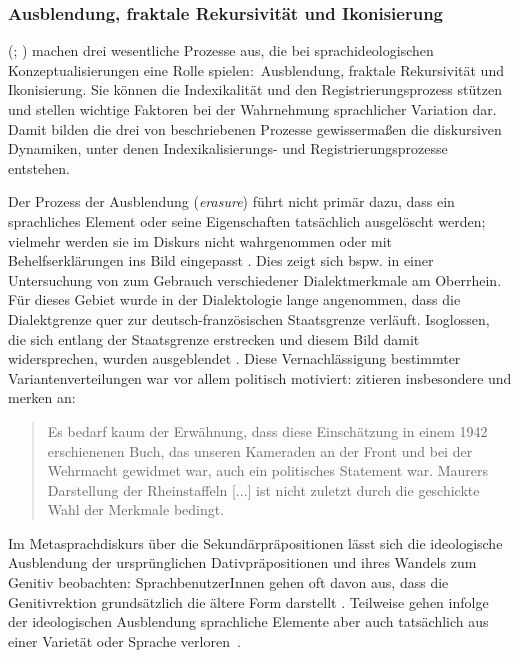 \subsubsection{Ausblendung, fraktale Rekursivität und Ikonisierung}
\label{sec:Prozesse}
\citeauthor{Irvine2000} (\citeyear{Irvine2000}; \citealp[s. auch][]{Gal.1995} \citeyear[und][]{Gal.2019}) machen drei wesentliche Prozesse aus, die bei sprachideologischen Konzeptualisierungen eine Rolle spielen:~Ausblendung, fraktale Rekursivit{\"a}t und Ikonisierung. 
Sie können die Indexikalität und den Registrierungsprozess stützen und stellen wichtige Faktoren bei der Wahrnehmung sprachlicher Variation dar.
Damit bilden die drei von \citet{Irvine2000} beschriebenen Prozesse gewissermaßen die diskursiven Dynamiken, unter denen Indexikalisierungs- und Registrierungsprozesse entstehen. 

Der Prozess der Ausblendung (\textit{erasure}) f{\"u}hrt nicht prim{\"a}r dazu, dass ein sprachliches Element oder seine Eigenschaften tats{\"a}chlich ausgel{\"o}scht werden; vielmehr werden sie im Diskurs nicht wahrgenommen oder mit Behelfserkl{\"a}rungen ins Bild eingepasst \citep[s.][38]{Irvine2000}.   
Dies zeigt sich bspw. in einer Untersuchung von \citet{Auer.2017} zum Gebrauch verschiedener Dialektmerkmale am Oberrhein. 
Für dieses Gebiet wurde in der Dialektologie lange angenommen, dass die Dialektgrenze quer zur deutsch-französischen Staatsgrenze verläuft.
Isoglossen, die sich entlang der Staatsgrenze erstrecken und diesem Bild damit widersprechen, wurden ausgeblendet \citep[s.][29]{Auer.2017}. 
Diese Vernachlässigung bestimmter {Va\-rian\-ten\-ver\-tei\-lungen} war vor allem politisch motiviert: \citet{Auer.2017} zitieren insbesondere \citet{Maurer.1942} und merken an: 
\begin{quote} Es bedarf kaum der Erwähnung, dass diese Einschätzung in einem 1942 erschienenen Buch, das \glqq unseren Kameraden an der Front und bei der Wehrmacht\grqq{} gewidmet war, auch ein politisches Statement war. Maurers Darstellung der \glqq Rheinstaffeln\grqq{} [...] ist nicht zuletzt durch die geschickte Wahl der Merkmale bedingt.~\citep[29]{Auer.2017}\end{quote}
Im Metasprachdiskurs {\"u}ber die Sekund{\"a}rpr{\"a}positionen l{\"a}sst sich die ideologische Ausblendung der urspr{\"u}nglichen Dativpr{\"a}positionen und ihres Wandels zum Genitiv beobachten: SprachbenutzerInnen gehen oft davon aus, dass die Genitivrektion grundsätzlich die ältere Form darstellt \citep[s.][46]{Szczepaniak2014}. 
Teilweise gehen infolge der ideologischen Ausblendung sprachliche Elemente aber auch tatsächlich aus einer Variet{\"a}t oder Sprache verloren~\citep[s.][38--39]{Irvine2000}.


